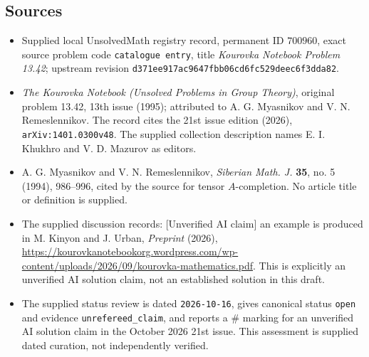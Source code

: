 \documentclass[11pt]{article}
\begin{document}
\subsection{Sources}
\begin{itemize}
\item Supplied local UnsolvedMath registry record, permanent ID \(700960\), exact source problem code \texttt{catalogue entry}, title \emph{Kourovka Notebook Problem 13.42}; upstream revision \texttt{d371ee917ac9647fbb06cd6fc529deec6f3dda82}.
\item \emph{The Kourovka Notebook (Unsolved Problems in Group Theory)}, original problem 13.42, 13th issue (1995); attributed to A. G. Myasnikov and V. N. Remeslennikov. The record cites the 21st issue edition (2026), \texttt{arXiv:1401.0300v48}. The supplied collection description names E. I. Khukhro and V. D. Mazurov as editors.
\item A. G. Myasnikov and V. N. Remeslennikov, \emph{Siberian Math. J.} \textbf{35}, no. 5 (1994), 986--996, cited by the source for tensor \(A\)-completion. No article title or definition is supplied.
\item The supplied discussion records: [Unverified AI claim] an example is produced in M. Kinyon and J. Urban, \emph{Preprint} (2026), \url{https://kourovkanotebookorg.wordpress.com/wp-content/uploads/2026/09/kourovka-mathematics.pdf}. This is explicitly an unverified AI solution claim, not an established solution in this draft.
\item The supplied status review is dated \texttt{2026-10-16}, gives canonical status \texttt{open} and evidence \texttt{unrefereed\_claim}, and reports a \(\#\) marking for an unverified AI solution claim in the October 2026 21st issue. This assessment is supplied dated curation, not independently verified.
\end{itemize}
\end{document}
